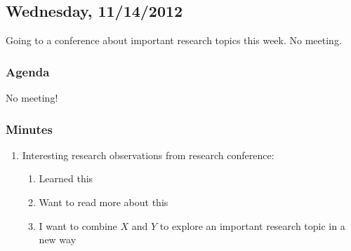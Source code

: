 \subsection{Wednesday, 11/14/2012}

Going to a conference about important research topics this week. No meeting.

\subsubsection{Agenda}

No meeting!

\subsubsection{Minutes}

\begin{enumerate}

    \item Interesting research observations from research conference:

        \begin{enumerate}

            \item Learned this

            \item Want to read more about this

            \item I want to combine $X$ and $Y$ to explore an important
                research topic in a new way

        \end{enumerate}

\end{enumerate}

